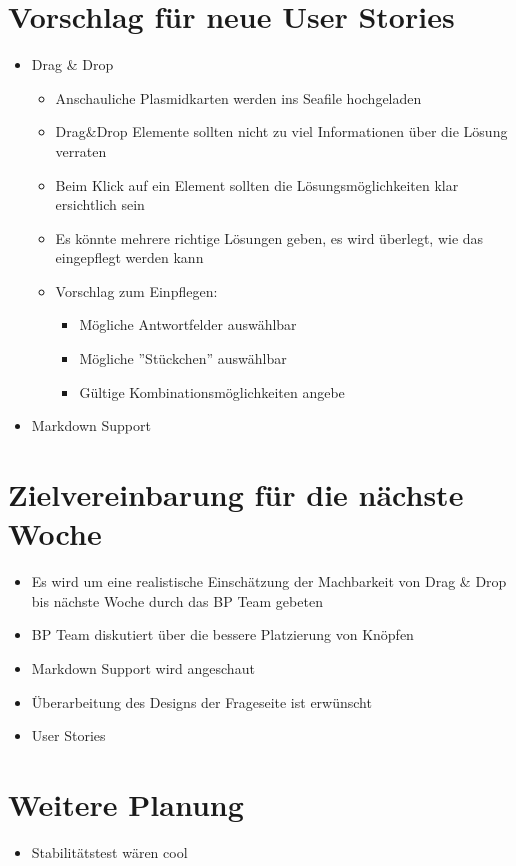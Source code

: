 \documentclass[colorback, accentcolor=tud1c, paper=a4]{tudexercise}
\begin{document}
\begin{multicols}{2}
\section{Vorschlag für neue User Stories}
\begin{itemize}
	\item Drag \& Drop
	\begin{itemize}
		\item Anschauliche Plasmidkarten werden ins Seafile hochgeladen
		\item Drag\&Drop Elemente sollten nicht zu viel Informationen über die Lösung verraten
		\item Beim Klick auf ein Element sollten die Lösungsmöglichkeiten klar ersichtlich sein
		\item Es könnte mehrere richtige Lösungen geben, es wird überlegt, wie das eingepflegt werden kann
		\item Vorschlag zum Einpflegen:
		\begin{itemize}
			\item Mögliche Antwortfelder auswählbar
			\item Mögliche ''Stückchen'' auswählbar
			\item Gültige Kombinationsmöglichkeiten angebe
		\end{itemize}
	\end{itemize}
	\item Markdown Support
\end{itemize}

\section{Zielvereinbarung für die nächste Woche}
\begin{itemize}
	\item Es wird um eine realistische Einschätzung der Machbarkeit von Drag \& Drop bis nächste Woche durch das BP Team gebeten
	\item BP Team diskutiert über die bessere Platzierung von Knöpfen
	\item Markdown Support wird angeschaut
	\item Überarbeitung des Designs der Frageseite ist erwünscht
	\item User Stories
\end{itemize}

\section{Weitere Planung}
\begin{itemize}
	\item Stabilitätstest wären cool
\end{itemize}

\end{multicols}
\end{document}
